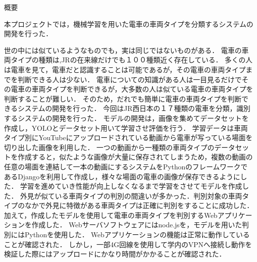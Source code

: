 

\begin{center}
		{\gtfamily \Large 概要}
\end{center}
\vspace{1cm}
\thispagestyle{empty}	



本プロジェクトでは，機械学習を用いた電車の車両タイプを分類するシステムの開発を行った．

世の中には似ているようなものでも，実は同じではないものがある．
電車の車両タイプの種類は,JRの在来線だけでも１００種類近く存在している．
多くの人は電車を見て，電車だと認識することは可能であるが，その電車の車両タイプまでを判断できる人は少ない．
電車についての知識がある人は一目見るだけでその電車の車両タイプを判断できるが，大多数の人は似ている電車の車両タイプを判断することが難しい．
そのため，だれでも簡単に電車の車両タイプを判断できるシステムの開発を行った．
今回はJR西日本の１７種類の電車を分類，識別するシステムの開発を行った．
モデルの開発は，画像を集めてデータセットを作成し，YOLOとデータセット用いて学習させ評価を行う．
学習データは車両タイプ別にYouTubeにアップロードされている動画から電車が写っている場面を切り出した画像を利用した．
一つの動画から一種類の車両タイプのデータセットを作成すると，似たような画像が大量に保存されてしまうため，複数の動画の任意の場面を連結して一本の動画にするシステムをPythonのフレームワークであるDjangoを利用して作成し，様々な場面の電車の画像が保存できるようにした．
学習を進めていき性能が向上しなくなるまで学習をさせてモデルを作成した．
外見が似ている車両タイプの判別の間違いが多かった．判別対象の車両タイプのなかで外見に特徴がある車両タイプは正確に判別をすることに成功した．
加えて，作成したモデルを使用して電車の車両タイプを判別するWebアプリケーションを作成した．
Webサーバソフトウェアにはnode.jsを，モデルを用いた判別にはPythonを使用した．
Webアプリケーションの機能は正常に動作していることが確認された．
しかし，一部4G回線を使用して学内のVPNへ接続し動作を検証した際にはアップロードにかなり時間がかかることが確認された．

\clearpage
